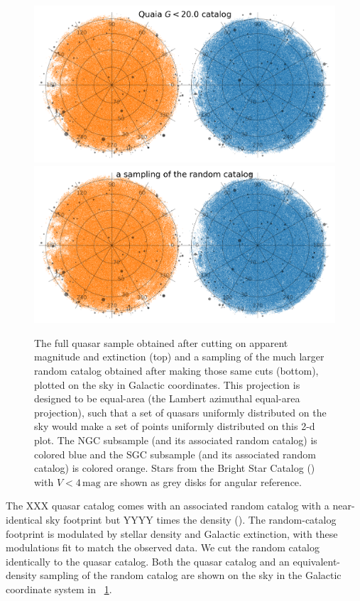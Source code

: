 \documentclass[modern]{aastex631}
\newlength{\figurewidth}
\newcommand{\unit}[1]{\mathrm{#1}}
\newcommand{\mg}{\unit{mag}}
\newcommand{\figref}[1]{\figurename~\ref{#1}}
\begin{document}
\begin{figure}[t!]
  \begin{mdframed}
  \color{captiongray}
  \begin{center}
    \includegraphics[width=\figurewidth]{notebooks/lb.png}\\
    \includegraphics[width=\figurewidth]{notebooks/lb_random.png}
  \end{center}
    \caption{The full quasar sample obtained after cutting on apparent magnitude and extinction (top) and a sampling of the much larger random catalog obtained after making those same cuts (bottom), plotted on the sky in Galactic coordinates.
    This projection is designed to be equal-area (the Lambert azimuthal equal-area projection), such that a set of quasars uniformly distributed on the sky would make a set of points uniformly distributed on this 2-d plot.
    The NGC subsample (and its associated random catalog) is colored blue and the SGC subsample (and its associated random catalog) is colored orange.
    Stars from the Bright Star Catalog (\citealt{bsc}) with $V<4\,\mg$ are shown as grey disks for angular reference.\label{fig:lb}}
  \end{mdframed}
\end{figure}
The XXX quasar catalog comes with an associated random catalog with a near-identical sky footprint but YYYY times the density (\citealt{quaia}).
The random-catalog footprint is modulated by stellar density and Galactic extinction, with these modulations fit to match the observed data.
We cut the random catalog identically to the quasar catalog.
Both the quasar catalog and an equivalent-density sampling of the random catalog are shown on the sky in the Galactic coordinate system in \figref{fig:lb}.
\end{document}

